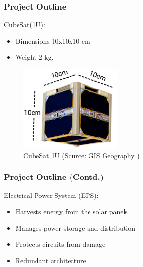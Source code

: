\documentclass[aspectratio=169]{beamer}
\begin{document}
\begin{frame}
	\frametitle{Project Outline	}

	\begin{minipage}{0.5\textwidth}
	CubeSat(1U):
\begin{itemize}
	
	\item Dimensions-10x10x10 cm 
	\item Weight-2 kg.
\end{itemize}
\end{minipage}
\begin{minipage}{0.3\textwidth}
		\begin{figure}
	\includegraphics[width=5.1cm]{cubes1.png}
	\begin{center}
		\caption{CubeSat 1U (Source: GIS Geography )}
	\end{center}
	\label{fig:trac2}
	
\end{figure}
	
\end{minipage}

	 \end{frame}


\begin{frame}
	\frametitle{Project Outline (Contd.)}
 	Electrical Power System (EPS):
 	\begin{itemize}
 		
 		\item Harvests energy from the solar panels
 		\item Manages power storage and distribution
 		\item Protects circuits from damage
 		\item Redundant architecture
 	\end{itemize}
\end{frame}
\end{document}

